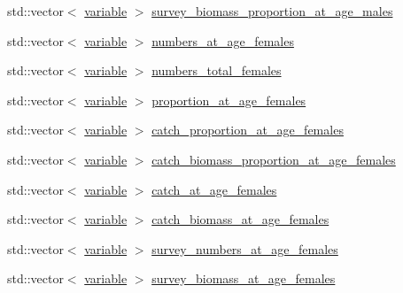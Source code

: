 \begin{DoxyCompactItemize}
\item 
std\-::vector$<$ \hyperlink{structmas_1_1_area_a3fb53ebc27c5323de15a81fbfbc7c878}{variable} $>$ \hyperlink{structmas_1_1_area_a11cdc9068612b7e08790a2ba50460e53}{survey\-\_\-biomass\-\_\-proportion\-\_\-at\-\_\-age\-\_\-males}
\item 
std\-::vector$<$ \hyperlink{structmas_1_1_area_a3fb53ebc27c5323de15a81fbfbc7c878}{variable} $>$ \hyperlink{structmas_1_1_area_a4ee583e6a3480b7216f38c9ebe8b8f60}{numbers\-\_\-at\-\_\-age\-\_\-females}
\item 
std\-::vector$<$ \hyperlink{structmas_1_1_area_a3fb53ebc27c5323de15a81fbfbc7c878}{variable} $>$ \hyperlink{structmas_1_1_area_a6ba5fdd790fe552bb732e8b81824c3d6}{numbers\-\_\-total\-\_\-females}
\item 
std\-::vector$<$ \hyperlink{structmas_1_1_area_a3fb53ebc27c5323de15a81fbfbc7c878}{variable} $>$ \hyperlink{structmas_1_1_area_a169ca9a1c03c80c565ef1ca425078fad}{proportion\-\_\-at\-\_\-age\-\_\-females}
\item 
std\-::vector$<$ \hyperlink{structmas_1_1_area_a3fb53ebc27c5323de15a81fbfbc7c878}{variable} $>$ \hyperlink{structmas_1_1_area_a1e2aa0671666187c26108ef2dc669239}{catch\-\_\-proportion\-\_\-at\-\_\-age\-\_\-females}
\item 
std\-::vector$<$ \hyperlink{structmas_1_1_area_a3fb53ebc27c5323de15a81fbfbc7c878}{variable} $>$ \hyperlink{structmas_1_1_area_ab3e0fc299986b3ce569d3da2c750fb05}{catch\-\_\-biomass\-\_\-proportion\-\_\-at\-\_\-age\-\_\-females}
\item 
std\-::vector$<$ \hyperlink{structmas_1_1_area_a3fb53ebc27c5323de15a81fbfbc7c878}{variable} $>$ \hyperlink{structmas_1_1_area_a6f5963d3731bc788e4ec0c0975ebb9b3}{catch\-\_\-at\-\_\-age\-\_\-females}
\item 
std\-::vector$<$ \hyperlink{structmas_1_1_area_a3fb53ebc27c5323de15a81fbfbc7c878}{variable} $>$ \hyperlink{structmas_1_1_area_a77be076c07976d8b8ca1f94e9f9bc00a}{catch\-\_\-biomass\-\_\-at\-\_\-age\-\_\-females}
\item 
std\-::vector$<$ \hyperlink{structmas_1_1_area_a3fb53ebc27c5323de15a81fbfbc7c878}{variable} $>$ \hyperlink{structmas_1_1_area_a5c4aa87c77904d0ea7b60aad5cf5e852}{survey\-\_\-numbers\-\_\-at\-\_\-age\-\_\-females}
\item 
std\-::vector$<$ \hyperlink{structmas_1_1_area_a3fb53ebc27c5323de15a81fbfbc7c878}{variable} $>$ \hyperlink{structmas_1_1_area_a903b4c889f85bdbd4804f15a6278c7b0}{survey\-\_\-biomass\-\_\-at\-\_\-age\-\_\-females}
\item 

\end{DoxyCompactItemize}
